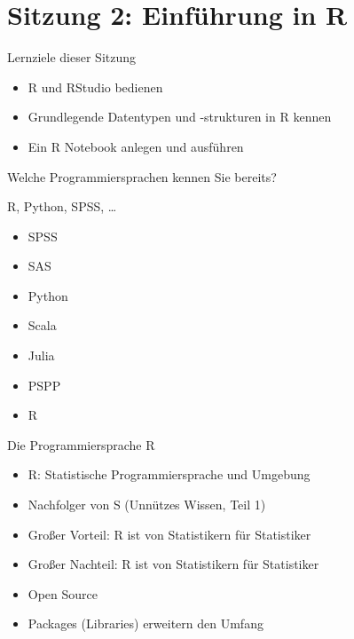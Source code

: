 \documentclass[
  ignorenonframetext,
]{beamer}
\providecommand{\tightlist}{%
  \setlength{\itemsep}{0pt}\setlength{\parskip}{0pt}}
\begin{document}
\section{Sitzung 2: Einführung in R}\label{sitzung-2-einfuxfchrung-in-r}

\begin{frame}{Lernziele dieser Sitzung}
\protect{}\label{lernziele-dieser-sitzung}
\begin{itemize}
\tightlist
\item
  R und RStudio bedienen
\item
  Grundlegende Datentypen und -strukturen in R kennen
\item
  Ein R Notebook anlegen und ausführen
\end{itemize}
\end{frame}

\begin{frame}{Welche Programmiersprachen kennen Sie bereits?}
\protect{}\label{welche-programmiersprachen-kennen-sie-bereits}
\end{frame}

\begin{frame}{R, Python, SPSS, \ldots{}}
\protect{}\label{r-python-spss}
\begin{itemize}
\tightlist
\item
  SPSS
\item
  SAS
\item
  Python
\item
  Scala
\item
  Julia
\item
  PSPP
\item
  R
\end{itemize}
\end{frame}

\begin{frame}{Die Programmiersprache R}
\protect{}\label{die-programmiersprache-r}
\begin{itemize}
\tightlist
\item
  R: Statistische Programmiersprache und Umgebung
\item
  Nachfolger von S (Unnützes Wissen, Teil 1)
\item
  Großer Vorteil: R ist von Statistikern für Statistiker
\item
  Großer Nachteil: R ist von Statistikern für Statistiker
\item
  Open Source
\item
  Packages (Libraries) erweitern den Umfang
\end{itemize}
\end{frame}
\end{document}
